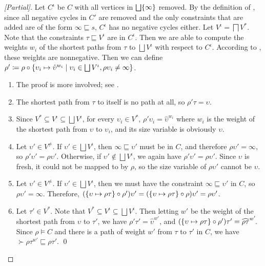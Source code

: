 \begin{proof}[{[Partial]}]
Let $C^\iota$ be $C$ with all vertices in $\bigsqcup \{\infty\}$ removed.
By the definition of \RecCheck, since all negative cycles in $C'$ are removed and the only constraints that are added are of the form $\infty \sqsubseteq s$,
$C^\iota$ has no negative cycles either.
Let $V^\iota = \bigsqcap V^*$.
Note that the constraints $\tau \sqsubseteq V^\iota$ are in $C^\iota$.
Then we are able to compute the weights $w_i$ of the shortest paths from $\tau$ to $\bigsqcup V^\iota$ with respect to $C^\iota$.
According to \citet{f-hat}, these weights are nonnegative.
Then we can define $\rho' \coloneqq \rho \circ \{\upsilon_i \mapsto \hat{\upsilon}^{w_i} \mid \upsilon_i \in \bigsqcup V^\iota, \rho\upsilon_i \neq \infty\}$.

\begin{enumerate}
  \item The proof is more involved; see \citet{f-hat}.
  \item The shortest path from $\tau$ to itself is no path at all, so $\rho'\tau = \upsilon$.
  \item Since $V^* \subseteq V^\iota \subseteq \bigsqcup V^\iota$, for every $\upsilon_i \in V^*$, $\rho'\upsilon_i = \hat{\upsilon}^{w_i}$ where $w_i$ is the weight of the shortest path from $\upsilon$ to $\upsilon_i$, and its size variable is obviously $\upsilon$.
  \item Let $\upsilon' \in V^\neq$. If $\upsilon' \in \bigsqcup V^\iota$, then $\infty \sqsubseteq \upsilon'$ must be in $C$, and therefore $\rho\upsilon' = \infty$, so $\rho'\upsilon' = \rho\upsilon'$. Otherwise, if $\upsilon' \notin \bigsqcup V^\iota$, we again have $\rho'\upsilon' = \rho\upsilon'$. Since $\upsilon$ is fresh, it could not be mapped to by $\rho$, so the size variable of $\rho\upsilon'$ cannot be $\upsilon$.
  \item Let $\upsilon' \in V^\neq$. If $\upsilon' \in \bigsqcup V^\iota$, then we must have the constraint $\infty \sqsubseteq \upsilon'$ in $C$, so $\rho\upsilon' = \infty$. Therefore, $(\{\upsilon \mapsto \rho\tau\} \circ \rho')\upsilon' = (\{\upsilon \mapsto \rho\tau\} \circ \rho)\upsilon' = \rho\upsilon'$.
  \item Let $\tau' \in V^*$. Note that $V^* \subseteq V^\iota \subseteq \bigsqcup V^\iota$.
  Then letting $w'$ be the weight of the shortest path from $\upsilon$ to $\tau'$, we have $\rho'\tau' = \hat{\upsilon}^{w'}$, and $(\{\upsilon \mapsto \rho\tau\} \circ \rho')\tau' = \widehat{\rho\tau}^{w'}\!$.
  Since $\rho \vDash C$ and there is a path of weight $w'$ from $\tau$ to $\tau'$ in $C$,
  we have $\succ{\rho\tau}^{w'}\! \sqsubseteq \rho\tau'$. \qed
\end{enumerate}
\end{proof}

